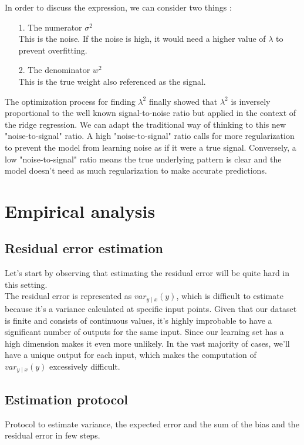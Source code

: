 \documentclass[12pt,titlepage]{article}
\begin{document}
In order to discuss the expression, we can consider two things : 
\begin{itemize}
    \item[1.] The numerator $\sigma^{2}$ \\
    This is the noise. If the noise is high, it would need a higher value of $\lambda$ to prevent overfitting.
    \item[2.] The denominator $w^{2}$ \\
    This is the true weight also referenced as the signal.
\end{itemize}

The optimization process for finding $\lambda^{2}$ finally showed that $\lambda^{2}$ is inversely proportional to the well known signal-to-noise ratio but applied in the context of the ridge regression. We can adapt the traditional way of thinking to this new "noise-to-signal" ratio. A high "noise-to-signal" ratio calls for more regularization to prevent
 the model from learning noise as if it were a true signal. Conversely, a low "noise-to-signal" ratio means the true underlying pattern is clear and the model doesn't need as much regularization to make accurate predictions.
 

\section{Empirical analysis}

\subsection{Residual error estimation}

Let’s start by observing that estimating the residual error will be quite hard in this setting. \\

The residual error is represented as $var_{y \mid x}(y)$, which is difficult to estimate because it’s a variance calculated at specific input points. Given that our dataset is finite and consists of continuous values, it’s highly improbable to have a significant number of outputs for the same input. Since our learning set has a high dimension makes it even more unlikely. In the vast majority of cases, we’ll have a unique output for each input, which makes the computation of $var_{y \mid x}(y)$ excessively difficult.

\subsection{Estimation protocol}
Protocol to estimate variance, the expected error and the sum of the bias and the residual error in few steps.
\end{document}
